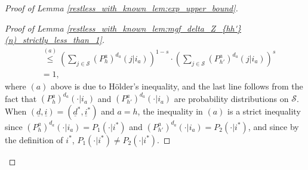 \begin{proof}[Proof of Lemma \ref{restless_with_known_lem:exp_upper_bound}]
\begin{proof}[Proof of Lemma \ref{restless_with_known_lem:mgf_delta_Z_{hh'}(n)_strictly_less_than_1}]
\begin{align}
 	&\stackrel{(a)}{\leq} \left(\sum\limits_{j\in\mathcal{S}}(P_h^a)^{d_a}(j|i_a)\right)^{1-s}\cdot \left(\sum\limits_{j\in\mathcal{S}}(P_{h'}^a)^{d_a}(j|i_a)\right)^s\nonumber\\
 	&=1,
 \end{align}\endgroup
 where $(a)$ above is due to H\"{o}lder's inequality, and the last line follows from the fact that $(P_h^a)^{d_a}(\cdot|i_a)$ and $(P_{h'}^a)^{d_a}(\cdot|i_a)$ are probability distributions on $\mathcal{S}$. When $(\underline{d},\underline{i})=(\underline{d}^*,\underline{i}^*)$ and $a=h$, the inequality in $(a)$ is a strict inequality since $(P_h^a)^{d_a}(\cdot|i_a)=P_1(\cdot|i^*)$ and $(P_{h'}^a)^{d_a}(\cdot|i_a)=P_2(\cdot|i^*)$, and since by the definition of $i^*$, $P_1(\cdot|i^*)\neq P_2(\cdot|i^*)$.
 \end{proof}
 

\end{proof}
